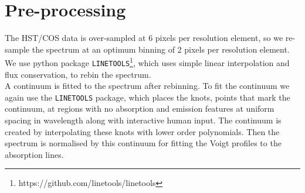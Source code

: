 \section{Pre-processing}

The HST/COS data is over-sampled at 6 pixels per resolution element, so we re-sample the spectrum at an optimum binning of 2 pixels per resolution element. We use python package {\tt{LINETOOLS}}\footnote{https://github.com/linetools/linetools}, which uses simple linear interpolation and flux conservation, to rebin the spectrum. 
\\
A continuum is fitted to the spectrum after rebinning. To fit the continuum we again use the {\tt{LINETOOLS}} package, which places the knots, points that mark the continuum, at regions with no absorption and emission features at uniform spacing in wavelength along with interactive human input. The continuum is created by interpolating these knots with lower order polynomials. Then the spectrum is normalised by this continuum for fitting the Voigt profiles to the absorption lines.  








